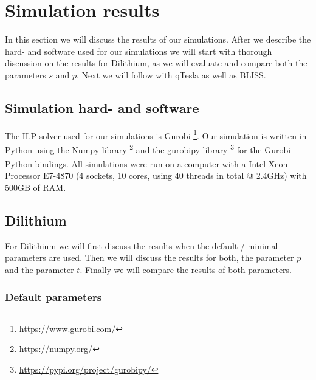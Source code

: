 \documentclass[a4paper,titlepage]{article}
\begin{document}
\section{Simulation results}
In this section we will discuss the results of our simulations. After we describe the hard- and software used for our simulations we will start with thorough discussion on the results for Dilithium, as we will evaluate and compare both the parameters $s$ and $p$. Next we will follow with qTesla as well as BLISS.

\subsection{Simulation hard- and software}
\label{sec:practise_server}
The ILP-solver used for our simulations is Gurobi \footnote{\url{https://www.gurobi.com/}}.
Our simulation is written in Python using the Numpy library \footnote{\url{https://numpy.org/}} and the gurobipy library \footnote{\url{https://pypi.org/project/gurobipy/}} for the Gurobi Python bindings. All simulations were run on a computer with a Intel\textsuperscript{\textregistered} Xeon\textsuperscript{\textregistered} Processor E7-4870 (4 sockets, 10 cores, using 40 threads in total @ 2.4GHz) with 500GB of RAM.

\subsection{Dilithium}
For Dilithium we will first discuss the results when the default / minimal parameters are used. Then we will discuss the results for both, the parameter $p$ and the parameter $t$. Finally we will compare the results of both parameters.

\subsubsection{Default parameters}
\label{sec:min_sig_amount}
\end{document}
